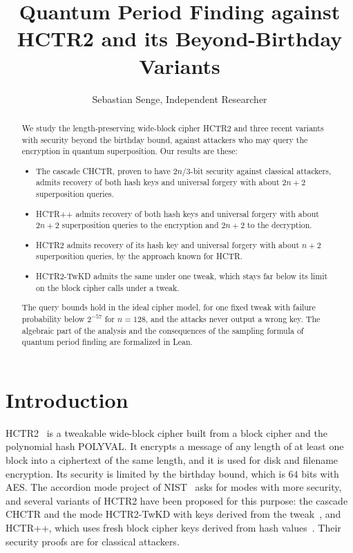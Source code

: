 \documentclass[11pt]{article}
\title{Quantum Period Finding against HCTR2 and its Beyond-Birthday Variants}
\author{Sebastian Senge, Independent Researcher}
\date{}
\theoremstyle{definition}
\theoremstyle{remark}
\begin{document}
\maketitle

\begin{abstract}
We study the length-preserving wide-block cipher HCTR2 and three recent variants with security beyond the birthday bound, against attackers who may query the encryption in quantum superposition. Our results are these:
\begin{itemize}[leftmargin=1.5em]
\item The cascade CHCTR, proven to have $2n/3$-bit security against classical attackers, admits recovery of both hash keys and universal forgery with about $2n+2$ superposition queries.
\item HCTR++ admits recovery of both hash keys and universal forgery with about $2n+2$ superposition queries to the encryption and $2n+2$ to the decryption.
\item HCTR2 admits recovery of its hash key and universal forgery with about $n+2$ superposition queries, by the approach known for HCTR.
\item HCTR2-TwKD admits the same under one tweak, which stays far below its limit on the block cipher calls under a tweak.
\end{itemize}
The query bounds hold in the ideal cipher model, for one fixed tweak with failure probability below $2^{-57}$ for $n=128$, and the attacks never output a wrong key. The algebraic part of the analysis and the consequences of the sampling formula of quantum period finding are formalized in Lean.
\end{abstract}

\section{Introduction}

HCTR2~\cite{CHB21} is a tweakable wide-block cipher built from a block cipher and the polynomial hash POLYVAL. It encrypts a message of any length of at least one block into a ciphertext of the same length, and it is used for disk and filename encryption. Its security is limited by the birthday bound, which is $64$ bits with AES. The accordion mode project of NIST~\cite{NIST25} asks for modes with more security, and several variants of HCTR2 have been proposed for this purpose: the cascade CHCTR and the mode HCTR2-TwKD with keys derived from the tweak~\cite{CHMNSS26}, and HCTR++, which uses fresh block cipher keys derived from hash values~\cite{OKY26}. Their security proofs are for classical attackers.
\end{document}
